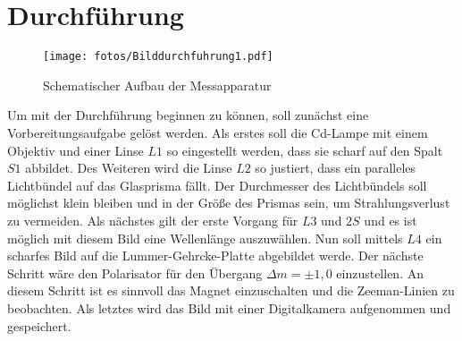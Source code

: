 \section{Durchführung}
\label{sec:Durchführung}
\begin{figure}[h]
	\centering
	\texttt{[image: fotos/Bilddurchfuhrung1.pdf]}
	\caption{Schematischer Aufbau der Messapparatur}
	\label{durch:1}
\end{figure}
Um mit der Durchführung beginnen zu können, soll zunächst eine Vorbereitungsaufgabe gelöst werden. Als erstes soll die Cd-Lampe mit einem Objektiv und einer Linse $L1$ so eingestellt werden, dass sie scharf auf den Spalt $S1$ abbildet. Des Weiteren wird die Linse $L2$ so justiert, dass ein paralleles Lichtbündel auf das Glasprisma fällt. Der Durchmesser des Lichtbündels soll möglichst klein bleiben und in der Größe des Prismas sein, um Strahlungsverlust zu vermeiden. Als nächstes gilt der erste Vorgang für $L3$ und $2S$ und es ist möglich mit diesem Bild eine Wellenlänge auszuwählen. Nun soll mittels $L4$ ein scharfes Bild auf die Lummer-Gehrcke-Platte abgebildet werde. Der nächste Schritt wäre den Polarisator für den Übergang $\Delta m = \pm 1,0$ einzustellen. An diesem Schritt ist es sinnvoll das Magnet einzuschalten und die Zeeman-Linien zu beobachten. Als letztes wird das Bild mit einer Digitalkamera aufgenommen und gespeichert.


